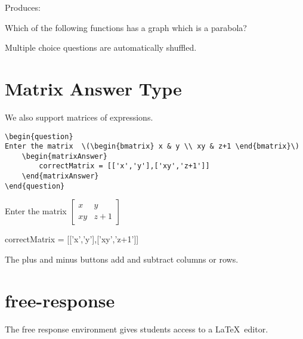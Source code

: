 \documentclass{ximera}
\begin{document}
Produces:

\begin{question}
  Which of the following functions has a graph which is a parabola?
  \begin{multipleChoice}
  \end{multipleChoice}
\end{question}

\begin{remark}
  Multiple choice questions are automatically shuffled.
\end{remark}

\section{Matrix Answer Type}

We also support matrices of expressions.

\begin{verbatim}
\begin{question}
Enter the matrix  \(\begin{bmatrix} x & y \\ xy & z+1 \end{bmatrix}\)
    \begin{matrixAnswer}
	    correctMatrix = [['x','y'],['xy','z+1']]
    \end{matrixAnswer}
\end{question}
\end{verbatim}

\begin{question}
  Enter the matrix  \(\begin{bmatrix} x & y \\ xy & z+1 \end{bmatrix}\)
  \begin{matrixAnswer}
    correctMatrix = [['x','y'],['xy','z+1']]
  \end{matrixAnswer}
\end{question}

\begin{remark}
  The plus and minus buttons add and subtract columns or rows.  
\end{remark}

\section{free-response}

The free response environment gives students access to a \LaTeX\ editor. 
\end{document}
